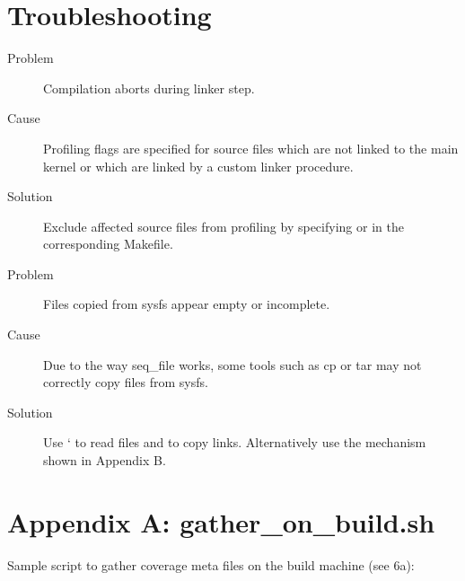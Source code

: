 \documentclass[a4paper,8pt,english]{sphinxmanual}
\begin{document}
\section{Troubleshooting}
\label{dev-tools/gcov:troubleshooting}\begin{description}
\item[{Problem}] \leavevmode
Compilation aborts during linker step.

\item[{Cause}] \leavevmode
Profiling flags are specified for source files which are not
linked to the main kernel or which are linked by a custom
linker procedure.

\item[{Solution}] \leavevmode
Exclude affected source files from profiling by specifying
 or  in the
corresponding Makefile.

\item[{Problem}] \leavevmode
Files copied from sysfs appear empty or incomplete.

\item[{Cause}] \leavevmode
Due to the way seq\_file works, some tools such as cp or tar
may not correctly copy files from sysfs.

\item[{Solution}] \leavevmode
Use ` to read  files and  to copy links.
Alternatively use the mechanism shown in Appendix B.

\end{description}


\section{Appendix A: gather\_on\_build.sh}
\label{dev-tools/gcov:appendix-a-gather-on-build-sh}
Sample script to gather coverage meta files on the build machine
(see 6a):
\end{document}
